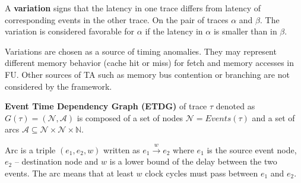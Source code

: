 A \textbf{variation} signs that the latency in one trace differs from latency of corresponding events in the other trace. On the pair of traces $\alpha$ and $\beta$. The variation is considered favorable for $\alpha$ if the latency in $\alpha$ is smaller than in $\beta$.

Variations are chosen as a source of timing anomalies. They may represent different memory behavior (cache hit or miss) for fetch and memory accesses in FU. Other sources of TA such as memory bus contention or branching are not considered by the framework.

\textbf{Event Time Dependency Graph (ETDG)} of trace $\tau$ denoted as $G(\tau) = (\mathcal{N}, \mathcal{A})$ is composed of a set of nodes $\mathcal{N} = Events(\tau)$ and a set of arcs $\mathcal{A} \subseteq \mathcal{N} \times \mathcal{N} \times \mathbb{N}$. 


Arc is a triple $(e_1, e_2, w)$ written as $e_1 \xrightarrow{w} e_2$ where $e_1$ is the source event node, $e_2$ -- destination node and $w$ is a lower bound of the delay between the two events. The arc means that at least $w$ clock cycles must pass between $e_1$ and $e_2$. 

